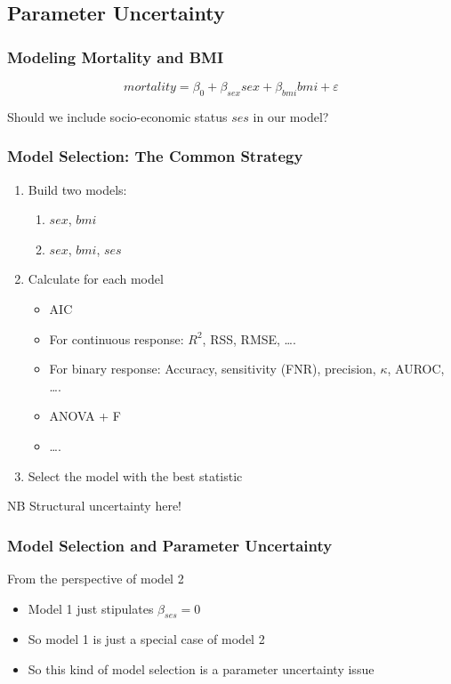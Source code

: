 \documentclass{philslides}
\begin{document}
\subsection{Parameter Uncertainty}
\frame
{
	\frametitle{Modeling Mortality and BMI}
	\[mortality = \beta_0 + \beta_{sex} sex + \beta_{bmi} bmi + \varepsilon\]
	\pause
	
	Should we include socio-economic status $ses$ in our model?  
}
\frame
{
	\frametitle{Model Selection: The Common Strategy}
	\begin{enumerate}
	\item Build two models:
		\begin{enumerate}
		\item $sex$, $bmi$
		\item $sex$, $bmi$, $ses$
		\end{enumerate}
	\item Calculate  for each model
		\begin{itemize}
		\item AIC \autocite[131ff]{Sober2015}
		\item For continuous response:  $R^2$, RSS, RMSE, \ldots.
		\item For binary response:  Accuracy, sensitivity (FNR), precision, $\kappa$, AUROC, \ldots.
		\item ANOVA + F
		\item \ldots.
		\end{itemize}
	\item Select the model with the best statistic
	\end{enumerate}
	\pause
	\blank
	\raggedleft NB Structural uncertainty here!  
}
\frame
{
	\frametitle{Model Selection and Parameter Uncertainty}
	From the perspective of model 2
	\begin{itemize}
		\item Model 1 just stipulates $\beta_{ses} = 0$
		\item So model 1 is just a special case of model 2
		\item So this kind of model selection is a parameter uncertainty issue
	\end{itemize}
}
\end{document}
